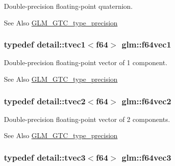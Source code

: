 Double-\/precision floating-\/point quaternion. 

\begin{DoxySeeAlso}{See Also}
\hyperlink{group__gtc__type__precision}{G\-L\-M\-\_\-\-G\-T\-C\-\_\-type\-\_\-precision} 
\end{DoxySeeAlso}
\hypertarget{group__gtc__type__precision_ga9dabdd8a91258b035759121fa7880cb6}{
\subsubsection[{f64vec1}]{\setlength{\rightskip}{0pt plus 5cm}typedef detail\-::tvec1$<$f64$>$ {\bf glm\-::f64vec1}}}\label{group__gtc__type__precision_ga9dabdd8a91258b035759121fa7880cb6}


Double-\/precision floating-\/point vector of 1 component. 

\begin{DoxySeeAlso}{See Also}
\hyperlink{group__gtc__type__precision}{G\-L\-M\-\_\-\-G\-T\-C\-\_\-type\-\_\-precision} 
\end{DoxySeeAlso}
\hypertarget{group__gtc__type__precision_gabffd600c237af59b1686fce1ef461a84}{
\subsubsection[{f64vec2}]{\setlength{\rightskip}{0pt plus 5cm}typedef detail\-::tvec2$<$f64$>$ {\bf glm\-::f64vec2}}}\label{group__gtc__type__precision_gabffd600c237af59b1686fce1ef461a84}


Double-\/precision floating-\/point vector of 2 components. 

\begin{DoxySeeAlso}{See Also}
\hyperlink{group__gtc__type__precision}{G\-L\-M\-\_\-\-G\-T\-C\-\_\-type\-\_\-precision} 
\end{DoxySeeAlso}
\hypertarget{group__gtc__type__precision_ga31fd7a60d11d5ce44f3fad7418c93ec5}{
\subsubsection[{f64vec3}]{\setlength{\rightskip}{0pt plus 5cm}typedef detail\-::tvec3$<$f64$>$ {\bf glm\-::f64vec3}}}\label{group__gtc__type__precision_ga31fd7a60d11d5ce44f3fad7418c93ec5}


